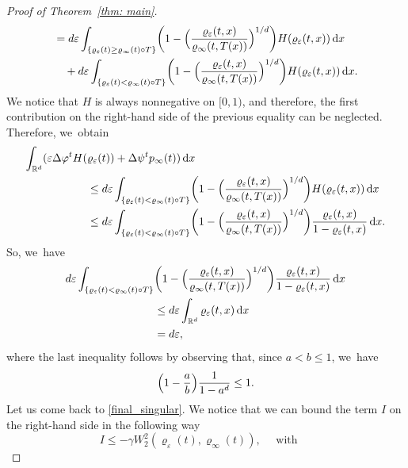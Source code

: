 \documentclass[11pt]{article}
\numberwithin{equation}{section}
\newcommand{\Bprt}[1]{\Bigl(#1\Bigr)}
\newcommand{\bbprt}[1]{\biggl(#1\biggr)}
\newcommand{\dx}[1]{\mathop{}\!\mathrm{d} #1}
\newcommand{\R}{\mathbb{R}}
\theoremstyle{plain}
\theoremstyle{remark}
\begin{document}
\begin{proof}[Proof of Theorem~\ref{thm: main}]
\begin{equation*}
\begin{split}
&= {d \varepsilon \int_{\{\varrho_\varepsilon(t) \geq \varrho_\infty(t)\circ T\}} \bbprt{1-\Bprt{\frac{\varrho_\varepsilon(t,x)}{\varrho_\infty(t,T(x))}}^{1/d}} H(\varrho_\varepsilon(t,x)) \dx x}\\
&\quad
+ {d \varepsilon \int_{\{\varrho_\varepsilon(t) < \varrho_\infty(t)\circ T\}} \bbprt{1-\Bprt{\frac{\varrho_\varepsilon(t,x)}{\varrho_\infty(t,T(x))}}^{1/d}} H(\varrho_\varepsilon(t,x)) \dx x}.
\end{split}
\end{equation*}
We notice that $H$ is always nonnegative on $[0,1)$, and therefore, the first contribution on the right-hand side of the previous equality can be neglected. Therefore, we~obtain
\begin{equation*}
\begin{split}
\int_{\R^d} (\varepsilon \Delta \varphi^t H(&\varrho_\varepsilon(t)) +\Delta \psi^t p_\infty(t) )\dx x
\\
&\le {d \varepsilon \int_{\{\varrho_\varepsilon(t) < \varrho_\infty(t)\circ T\}} \bbprt{1-\Bprt{\frac{\varrho_\varepsilon(t,x)}{\varrho_\infty(t,T(x))}}^{1/d}} H(\varrho_\varepsilon(t,x)) \dx x}\\
&\leq d \varepsilon \int_{{\{\varrho_\varepsilon(t) < \varrho_\infty(t)\circ T\}}} \bbprt{1-\Bprt{\frac{\varrho_\varepsilon(t,x)}{\varrho_\infty(t,T(x))}}^{1/d}} \frac{\varrho_\varepsilon(t,x)}{1-\varrho_\varepsilon(t,x)} \dx x.
\end{split}
\end{equation*}
So, we~have
\begin{equation}
\label{singular terms}
\begin{split}
d \varepsilon \int_{{\{\varrho_\varepsilon(t) < \varrho_\infty(t)\circ T\}}} & \bbprt{1-\Bprt{\frac{\varrho_\varepsilon(t,x)}{\varrho_\infty(t,T(x))}}^{1/d}} \frac{\varrho_\varepsilon(t,x)}{1-\varrho_\varepsilon(t,x)} \dx x\\
&\le d \varepsilon \int_{\R^d} \varrho_\varepsilon(t,x) \dx x\\
&= d \varepsilon,
\end{split}
\end{equation}
where the last inequality follows by observing that, since $a<b\leq 1$, we~have
\[
\Bigl(1-\frac ab\Bigr)\frac{1}{1-a^d}\leq 1.
\]
Let us come back to \eqref{final_singular}.
We notice that we can bound the term $I$ on the right-hand side in the following way
\begin{equation*}
I\leq -\gamma W_2^2(\varrho_\varepsilon(t),\varrho_\infty(t)), \quad
\text{ with } \quad

\end{equation*}
\end{proof}
\end{document}
